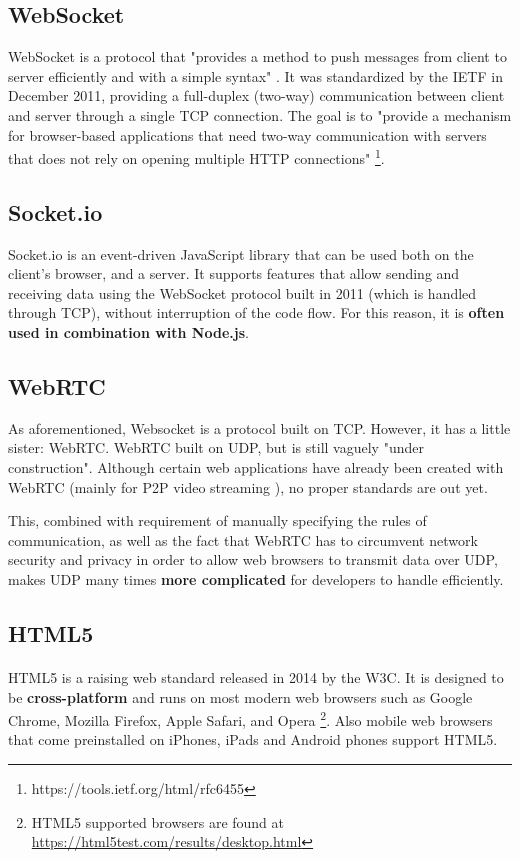 \documentclass[bsc,frontabs,twoside,singlespacing,parskip,deptreport]{infthesis}     %
\begin{document}
\subsection{WebSocket}
WebSocket is a protocol that "provides a method to push messages from client to server efficiently and with a simple syntax" \cite{WebSocket}. It was standardized by the IETF in December 2011, providing a full-duplex (two-way) communication between client and server through a single TCP connection. The goal is to "provide a mechanism for browser-based applications that need two-way communication with servers that does not rely on opening multiple HTTP connections" \footnote{https://tools.ietf.org/html/rfc6455}.

\subsection{Socket.io}
Socket.io is an event-driven JavaScript library that can be used both on the client's browser, and a server\cite{Socketio}. It supports features that allow sending and receiving data using the WebSocket protocol built in 2011 (which is handled through TCP), without interruption of the code flow\cite{Socketio_Benchmark}\cite{Socketio_TCP_Benchmark}. For this reason, it is \textbf{often used in combination with Node.js}.

\subsection{WebRTC}
As aforementioned, Websocket is a protocol built on TCP. However, it has a little sister: WebRTC. WebRTC built on UDP, but is still vaguely "under construction"\cite{Browser_Networking}. Although certain web applications have already been created with WebRTC (mainly for P2P video streaming \cite{P2P_Video_Streaming_HTML5_WebRTC}), no proper standards are out yet\cite{Web_Apps_Superior}.

This, combined with requirement of manually specifying the rules of communication, as well as the fact that WebRTC has to circumvent network security and privacy in order to allow web browsers to transmit data over UDP\cite{P2P_Video_Streaming_HTML5_WebRTC}, makes UDP many times \textbf{more complicated} for developers to handle efficiently.

\subsection{HTML5}
\paragraph{}HTML5 is a raising web standard released in 2014 by the W3C. It is designed to be \textbf{cross-platform} and runs on most modern web browsers such as Google Chrome, Mozilla Firefox, Apple Safari, and Opera \footnote{HTML5 supported browsers are found at \url{https://html5test.com/results/desktop.html}}. Also mobile web browsers that come preinstalled on iPhones, iPads and Android phones support HTML5.
\end{document}
